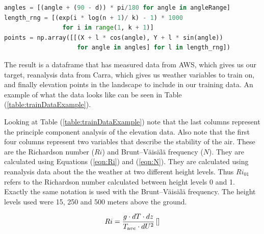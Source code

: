 \begin{lstlisting}[language = Python, caption = {Sector elevation points generated}, label = code:sectorElevation]
angles = [(angle + (90 - d)) * pi/180 for angle in angleRange]
length_rng = [(exp(i * log(n + 1)/ k) - 1) * 1000 
                for i in range(1, k + 1)]
points = np.array([[(X + l * cos(angle), Y + l * sin(angle))
                    for angle in angles] for l in length_rng])   
\end{lstlisting}

The result is a dataframe that has measured data from AWS, which gives us our target, reanalysis data from Carra, which gives us weather variables to train on, and finally elevation points in the landscape to include in our training data. An example of what the data looks like can be seen in Table (\ref{table:trainDataExample}).

\begin{table}[h]
    \caption{An example of data structure used with model}
    \label{table:trainDataExample}
\end{table}

Looking at Table (\ref{table:trainDataExample}) note that the last \nPCA columns represent the principle component analysis of the elevation data. Also note that the first four columns represent two variables that describe the stability of the air. These are the Richardson number ($Ri$)\cite{richardson_number_skybrary} and Brunt–Väisälä frequency\cite{brunt_vaisala_freq_eumtrain} ($N$). They are calculated using Equations (\ref{eqn:Ri}) and (\ref{eqn:N})\cite{mean_gust_HA_HO}. They are calculated using reanalysis data about the the weather at two different height levels. Thus $Ri_{01}$ refers to the Richardson number calculated between height levels 0 and 1. Exactly the same notation is used with the Brunt–Väisälä frequency. The height levels used were 15, 250 and 500 meters above the ground.

\begin{equation}
    \label{eqn:Ri}
    Ri = \frac{g \cdot dT \cdot dz}{T_{\textrm ave} \cdot dU^2} \, \mathrm{[]}
\end{equation}

